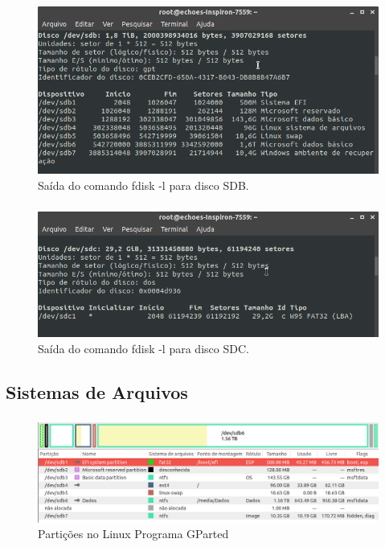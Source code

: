\documentclass{beamer}
\begin{document}
\begin{frame}[plain,c]
    \frametitle{\insertsection}
    \framesubtitle{\insertsubsection}
    \begin{figure}
        \centering
        \includegraphics[scale=0.6]{images/disco2.png}
        \caption{Saída do comando fdisk -l para disco SDB.}
    \end{figure}  
\end{frame}
\begin{frame}[plain,c]
    \frametitle{\insertsection}
    \framesubtitle{\insertsubsection}
    \begin{figure}
        \centering
        \includegraphics[scale=0.6]{images/disco3.png}
        \caption{Saída do comando fdisk -l para disco SDC.}
    \end{figure}  
\end{frame}

\subsection{Sistemas de Arquivos}
\begin{frame}[plain,c]
   \frametitle{\insertsection}
    \framesubtitle{\insertsubsection}
    \begin{figure}
        \centering
        \includegraphics[width=2.1\linewidth]{images/particoes.png}
        \caption{Partições no Linux Programa GParted}
    \end{figure}
\end{frame}
\end{document}
